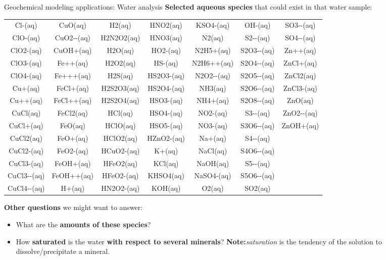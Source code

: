 %
\begin{frame}{Geochemical modeling applications: Water analysis}
\textbf{Selected aqueous species} that could exist in that water sample:
\vskip 1pt
{\scriptsize%
\begin{tabular*}{1\columnwidth}{@{\extracolsep{\fill}}ccccccc}
Cl-(aq) & CuO(aq) & H2(aq) & HNO2(aq) & KSO4-(aq) & OH-(aq) & SO3-{}-(aq)
\tabularnewline
ClO-(aq) & CuO2-{}-(aq) & H2N2O2(aq) & HNO3(aq) & N2(aq) & S2-{}-(aq) & SO4-{}-(aq)\tabularnewline
ClO2-(aq) & CuOH+(aq) & H2O(aq) & HO2-(aq) & N2H5+(aq) & S2O3-{}-(aq) & Zn++(aq)\tabularnewline
ClO3-(aq) & Fe++(aq) & H2O2(aq) & HS-(aq) & N2H6++(aq) & S2O4-{}-(aq) & ZnCl+(aq)\tabularnewline
ClO4-(aq) & Fe+++(aq) & H2S(aq) & HS2O3-(aq) & N2O2-{}-(aq) & S2O5-{}-(aq) & ZnCl2(aq)\tabularnewline
Cu+(aq) & FeCl+(aq) & H2S2O3(aq) & HS2O4-(aq) & NH3(aq) & S2O6-{}-(aq) & ZnCl3-(aq)\tabularnewline
Cu++(aq) & FeCl++(aq) & H2S2O4(aq) & HSO3-(aq) & NH4+(aq) & S2O8-{}-(aq) & ZnO(aq)\tabularnewline
CuCl(aq) & FeCl2(aq) & HCl(aq) & HSO4-(aq) & NO2-(aq) & S3-{}-(aq) & ZnO2-{}-(aq)\tabularnewline
CuCl+(aq) & FeO(aq) & HClO(aq) & HSO5-(aq) & NO3-(aq) & S3O6-{}-(aq) & ZnOH+(aq)\tabularnewline
CuCl2(aq) & FeO+(aq) & HClO2(aq) & HZnO2-(aq) & Na+(aq) & S4-{}-(aq) & \tabularnewline
CuCl2-(aq) & FeO2-(aq) & HCuO2-(aq) & K+(aq) & NaCl(aq) & S4O6-{}-(aq) & \tabularnewline
CuCl3-(aq) & FeOH+(aq) & HFeO2(aq) & KCl(aq) & NaOH(aq) & S5-{}-(aq) & \tabularnewline
CuCl3-{}-(aq) & FeOH++(aq) & HFeO2-(aq) & KHSO4(aq) & NaSO4-(aq) & S5O6-{}-(aq) & \tabularnewline
CuCl4-{}-(aq) & H+(aq) & HN2O2-(aq) & KOH(aq) & O2(aq) & SO2(aq) & \tabularnewline
\end{tabular*}}

\pause
\vskip 5pt
\alert{\textbf{Other questions}} we might want to answer: 
\begin{itemize}
\item What are the \textbf{amounts of these species}? 
\item How \textbf{saturated} is the water \textbf{with respect to several minerals}? \textbf{Note:}\emph{saturation} is the tendency of the solution to dissolve/precipitate a mineral.
\end{itemize}
\end{frame}
%
